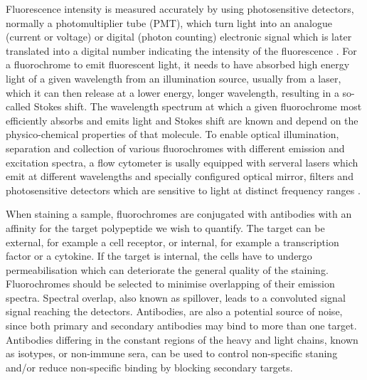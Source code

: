 Fluorescence intensity is measured accurately by using photosensitive detectors, normally a photomultiplier tube (PMT), which turn light into an analogue (current or voltage)
or digital (photon counting) electronic signal which is later translated into a digital number indicating the intensity of the fluorescence \citep{Shapiro:2003vq,Snow:2004ci}.
For a fluorochrome to emit fluorescent light, it needs to have absorbed high energy light of a given wavelength from an illumination source, usually from a laser, which it can then release at a lower energy, longer wavelength, resulting in a so-called Stokes shift.
The wavelength spectrum at which a given fluorochrome most efficiently absorbs and emits light and Stokes shift are known and depend on the physico-chemical properties of that molecule.
To enable optical illumination, separation and collection of various fluorochromes with different emission and excitation spectra, a flow cytometer is usally equipped with serveral lasers which emit at different wavelengths and specially configured optical mirror, filters and photosensitive detectors which are sensitive to light at distinct frequency ranges \citep{Shapiro:2003vq}.


When staining a sample, fluorochromes are conjugated with antibodies with an affinity for the target polypeptide we wish to quantify.
The target can be external, for example a cell receptor, or internal, for example a transcription factor or a cytokine.
If the target is internal, the cells have to undergo permeabilisation which can deteriorate the general quality of the staining.
Fluorochromes should be selected to minimise overlapping of their emission spectra.
Spectral overlap, also known as spillover, leads to a convoluted signal signal reaching the detectors.
Antibodies, are also a potential source of noise, since both primary and secondary antibodies may bind to more than one target.
Antibodies differing in the constant regions of the heavy and light chains, known as isotypes, or non-immune sera, can be used to control non-specific staning and/or reduce non-specific binding by blocking secondary targets.

